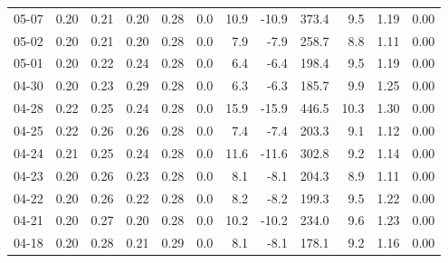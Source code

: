 \begin{threeparttable}
{\begin{tabular}{lrrrrrrrrrrr}
  05-07 &          0.20 &          0.21 &          0.20 &        0.28 &                 0.0 &                10.9 &      -10.9 &               373.4 &              9.5 &            1.19 &                   0.00 \\
  05-02 &          0.20 &          0.21 &          0.20 &        0.28 &                 0.0 &                 7.9 &       -7.9 &               258.7 &              8.8 &            1.11 &                   0.00 \\
  05-01 &          0.20 &          0.22 &          0.24 &        0.28 &                 0.0 &                 6.4 &       -6.4 &               198.4 &              9.5 &            1.19 &                   0.00 \\
  04-30 &          0.20 &          0.23 &          0.29 &        0.28 &                 0.0 &                 6.3 &       -6.3 &               185.7 &              9.9 &            1.25 &                   0.00 \\
  04-28 &          0.22 &          0.25 &          0.24 &        0.28 &                 0.0 &                15.9 &      -15.9 &               446.5 &             10.3 &            1.30 &                   0.00 \\
  04-25 &          0.22 &          0.26 &          0.26 &        0.28 &                 0.0 &                 7.4 &       -7.4 &               203.3 &              9.1 &            1.12 &                   0.00 \\
  04-24 &          0.21 &          0.25 &          0.24 &        0.28 &                 0.0 &                11.6 &      -11.6 &               302.8 &              9.2 &            1.14 &                   0.00 \\
  04-23 &          0.20 &          0.26 &          0.23 &        0.28 &                 0.0 &                 8.1 &       -8.1 &               204.3 &              8.9 &            1.11 &                   0.00 \\
  04-22 &          0.20 &          0.26 &          0.22 &        0.28 &                 0.0 &                 8.2 &       -8.2 &               199.3 &              9.5 &            1.22 &                   0.00 \\
  04-21 &          0.20 &          0.27 &          0.20 &        0.28 &                 0.0 &                10.2 &      -10.2 &               234.0 &              9.6 &            1.23 &                   0.00 \\
  04-18 &          0.20 &          0.28 &          0.21 &        0.29 &                 0.0 &                 8.1 &       -8.1 &               178.1 &              9.2 &            1.16 &                   0.00 \\

\end{tabular}}
\end{threeparttable}

